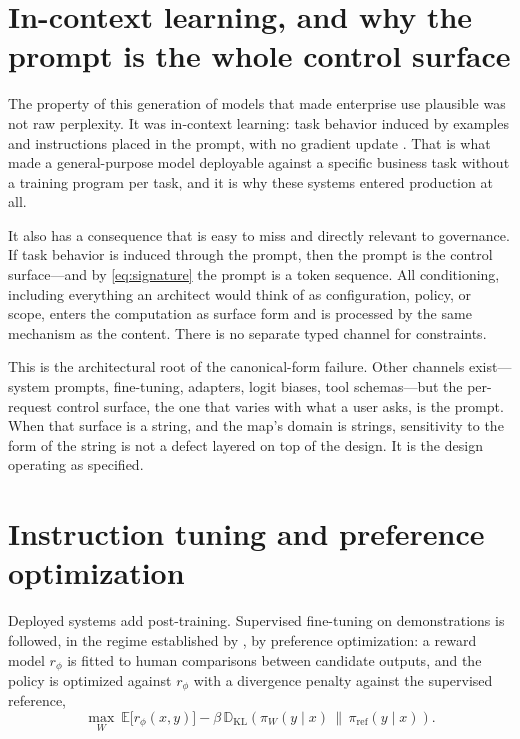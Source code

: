 \section{In-context learning, and why the prompt is the whole control surface}
\label{sec:icl}

The property of this generation of models that made enterprise use plausible was
not raw perplexity. It was in-context learning: task behavior induced by
examples and instructions placed in the prompt, with no gradient update
\citep{brown2020}. That is what made a general-purpose model deployable against a
specific business task without a training program per task, and it is why these
systems entered production at all.

It also has a consequence that is easy to miss and directly relevant to
governance. If task behavior is induced through the prompt, then the prompt is the
control surface---and by \eqref{eq:signature} the prompt is a token sequence. All
conditioning, including everything an architect would think of as configuration,
policy, or scope, enters the computation as surface form and is processed by the
same mechanism as the content. There is no separate typed channel for constraints.

This is the architectural root of the canonical-form failure. Other channels exist---system prompts,
fine-tuning, adapters, logit biases, tool schemas---but the per-request control
surface, the one that varies with what a user asks, is the prompt. When that surface
is a string, and
the map's domain is strings, sensitivity to the form of the string is not a defect
layered on top of the design. It is the design operating as specified.

\section{Instruction tuning and preference optimization}
\label{sec:rlhf}

Deployed systems add post-training. Supervised fine-tuning on demonstrations is
followed, in the regime established by \citet{ouyang2022}, by preference
optimization: a reward model $r_\phi$ is fitted to human comparisons between
candidate outputs, and the policy is optimized against $r_\phi$ with a divergence
penalty against the supervised reference,
\begin{equation}
  \max_{W}\ \mathbb{E}\bigl[r_\phi(x, y)\bigr]
  - \beta\, \mathbb{D}_{\mathrm{KL}}\!\left(\pi_W(y \mid x)
    \,\|\, \pi_{\mathrm{ref}}(y \mid x)\right).
  \label{eq:rlhf}
\end{equation}

